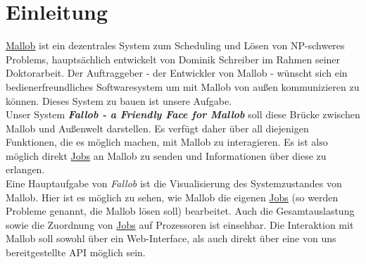 \section{Einleitung}



\href{https://github.com/domschrei/mallob}{Mallob} ist ein dezentrales System zum Scheduling und Lösen von \glspl{NP-schweres Problem}, hauptsächlich entwickelt von Dominik Schreiber im Rahmen seiner Doktorarbeit. Der Auftraggeber - der Entwickler von Mallob - wünscht sich ein bedienerfreundliches Softwaresystem um mit Mallob von außen kommunizieren zu können. Dieses System zu bauen ist unsere Aufgabe.\\
Unser System \textbf{\textit{Fallob - a Friendly Face for Mallob}} soll diese Brücke zwischen Mallob und Außenwelt darstellen.
Es verfügt daher über all diejenigen Funktionen, die es möglich machen, mit Mallob zu interagieren. Es ist also möglich direkt \hyperref[B:Jobs]{Jobs} an Mallob zu senden und Informationen über diese zu erlangen.\\
Eine Hauptaufgabe von \textit{Fallob} ist die Visualisierung des Systemzustandes von Mallob. Hier ist es möglich zu sehen, wie Mallob die eigenen \hyperref[B:Jobs]{Jobs} (so werden Probleme genannt, die Mallob lösen soll) bearbeitet. Auch die Gesamtauslastung sowie die Zuordnung von \hyperref[B:Jobs]{Jobs} auf Prozessoren ist einsehbar. 
Die Interaktion mit Mallob soll sowohl über ein \gls{Web-Interface}, als auch direkt über eine von uns bereitgestellte \gls{API} möglich sein. %





